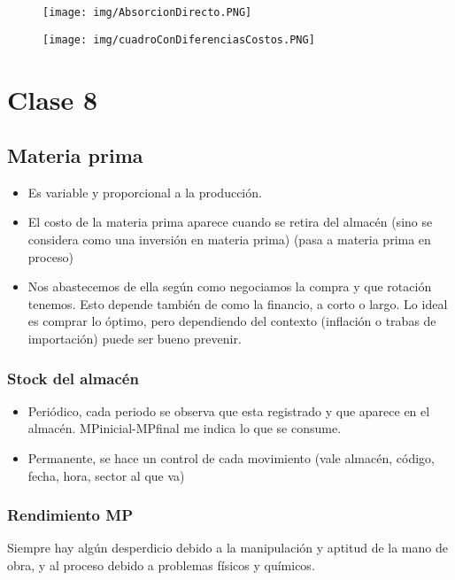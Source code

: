 \documentclass[titlepage,a4paper]{article}
\begin{document}
\begin{figure}[!htb]
    \centering
    \texttt{[image: img/AbsorcionDirecto.PNG]}
\end{figure}

\begin{figure}[!htb]
    \centering
    \texttt{[image: img/cuadroConDiferenciasCostos.PNG]}
\end{figure}

\newpage
\section*{Clase 8}

\subsection{Materia prima}
\begin{itemize}
\item Es variable y proporcional a la producción.
\item El costo de la materia prima aparece cuando se retira del almacén (sino se considera como una inversión en materia prima) (pasa a materia prima en proceso)
\item Nos abastecemos de ella según como negociamos la compra y que rotación tenemos. Esto depende también de como la financio, a corto o largo. Lo ideal es comprar lo óptimo, pero dependiendo del contexto (inflación o trabas de importación) puede ser bueno prevenir.
\end{itemize}



\subsubsection*{Stock del almacén}
\begin{itemize}
\item Periódico, cada periodo se observa que esta registrado y que aparece en el almacén. MPinicial-MPfinal me indica lo que se consume.
\item Permanente, se hace un control de cada movimiento (vale almacén, código, fecha, hora, sector al que va)
\end{itemize}




\subsubsection*{Rendimiento MP}
Siempre hay algún desperdicio debido a la manipulación y aptitud de la mano de obra, y al proceso debido a problemas físicos y químicos.
\end{document}
